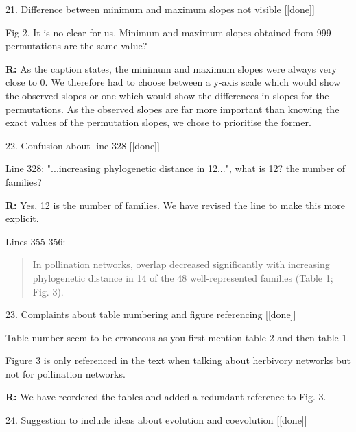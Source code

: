 \documentclass[12pt]{letter}
\newenvironment{refquote}{\bigskip \begin{it}}{\end{it}\smallskip}
\begin{document}
	21. Difference between minimum and maximum slopes not visible [[done]]

		\begin{refquote}
			Fig 2. It is no clear for us. Minimum and maximum slopes obtained from 999 permutations are the same value?
		\end{refquote}


		\textbf{R:} As the caption states, the minimum and maximum slopes were always very close to 0. We therefore had to choose between a y-axis scale which would show the observed slopes or one which would show the differences in slopes for the permutations. As the  observed slopes are far more important than knowing the exact values of the permutation slopes, we chose to prioritise the former.


	22. Confusion about line 328 [[done]]

		\begin{refquote}
			Line  328: "...increasing phylogenetic distance in 12...", what is 12? the number of families?
		\end{refquote}

		\textbf{R:} Yes, 12 is the number of families. We have revised the line to make this more explicit.


		Lines 355-356: 


		\begin{quotation}

		In pollination networks, overlap decreased significantly with increasing phylogenetic distance in 14 of the 48 well-represented families (Table 1; Fig. 3).

		\end{quotation}


	23. Complaints about table numbering and figure referencing [[done]]

		\begin{refquote}
			Table number seem to be erroneous as you first mention table 2 and then table 1.

			\smallskip

			Figure 3 is only referenced in the text when talking about herbivory networks but not for pollination networks.
		\end{refquote}

		\textbf{R:} We have reordered the tables and added a redundant reference to Fig. 3.


	24. Suggestion to include ideas about evolution and coevolution [[done]]
\end{document}
